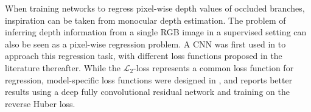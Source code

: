 When training networks to regress pixel-wise depth values of occluded branches, inspiration can be taken from monocular depth estimation. The problem of inferring depth information from a single RGB image in a supervised setting can also be seen as a pixel-wise regression problem. A CNN was first used in \cite{eigen2014firstNNdepth_map_pred} to approach this regression task, with different loss functions proposed in the literature thereafter. While the $\mathcal{L}_2$-loss represents a common loss function for regression, model-specific loss functions were designed in \cite{eigen2015specific_loss_d_esti}, 
and  \cite{laina2016resnet_for_d_esti} reports better results using a deep fully convolutional residual network and training on the reverse Huber loss.

